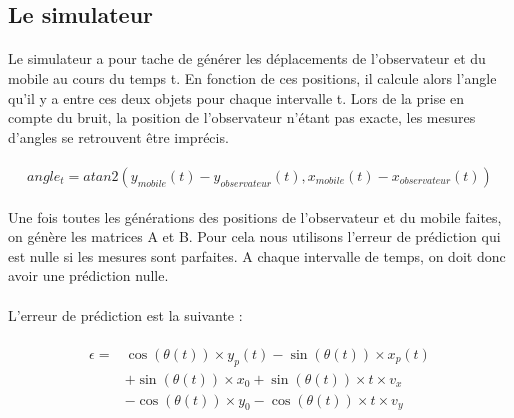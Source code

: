 \documentclass[a4paper,11pt]{article}
\begin{document}
		\subsection{Le simulateur}
		\paragraph{}
		Le simulateur a pour tache de générer les déplacements de l'observateur et du mobile au cours du temps t. En fonction de ces positions, il calcule alors l'angle qu'il y a entre ces deux objets pour chaque intervalle t. Lors de la prise en compte du bruit, la position de l'observateur n'étant pas exacte, les mesures d'angles se retrouvent être imprécis.

		\paragraph{}
			\begin{equation} 
				angle_{t} = atan2( y_{mobile}(t) -  y_{observateur}(t) , x_{mobile}(t) -  x_{observateur}(t) )
			\end{equation}

		\paragraph{}
		Une fois toutes les générations des positions de l'observateur et du mobile faites, on génère les matrices A et B.
		Pour cela nous utilisons l'erreur de prédiction qui est nulle si les mesures sont parfaites. A chaque intervalle de temps, on doit donc avoir une prédiction nulle.

		\paragraph{}
		L’erreur de prédiction est la suivante :

		\paragraph{}
		\begin{equation}
		   \begin{split}
		      \epsilon=&\cos(\theta(t)) \times y_p(t) -\sin(\theta(t)) \times x_p(t)\\
		        &+\sin(\theta(t)) \times x_0 +\sin(\theta(t)) \times t \times v_x\\
		        &-\cos(\theta(t)) \times y_0 -\cos(\theta(t)) \times t \times v_y
		   \end{split}
		\end{equation}
\end{document}
